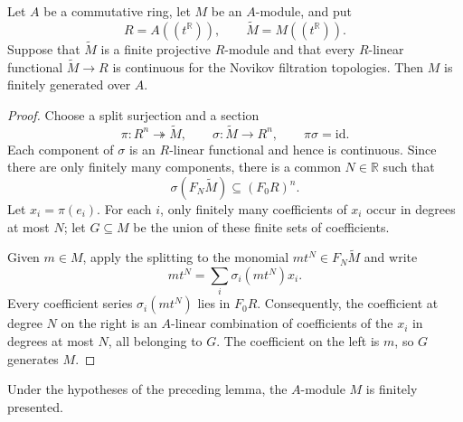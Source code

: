 \begin{lemma}
  \label{lem:finite_generation_real_novikov_series}
  \leanok
  Let $A$ be a commutative ring, let $M$ be an $A$-module, and put
  \[
    R=A((t^{\mathbb{R}})),\qquad \widetilde M=M((t^{\mathbb{R}})).
  \]
  Suppose that $\widetilde M$ is a finite projective $R$-module and that every
  $R$-linear functional $\widetilde M\to R$ is continuous for the Novikov
  filtration topologies.  Then $M$ is finitely generated over $A$.
\end{lemma}

\begin{proof}
  \leanok
  Choose a split surjection and a section
  \[
    \pi\colon R^n\twoheadrightarrow\widetilde M,
    \qquad
    \sigma\colon\widetilde M\longrightarrow R^n,
    \qquad \pi\sigma=\mathrm{id}.
  \]
  Each component of $\sigma$ is an $R$-linear functional and hence is
  continuous.  Since there are only finitely many components, there is a
  common $N\in\mathbb{R}$ such that
  \[
    \sigma(F_N\widetilde M)\subseteq(F_0R)^n.
  \]
  Let $x_i=\pi(e_i)$.  For each $i$, only finitely many coefficients of $x_i$
  occur in degrees at most $N$; let $G\subseteq M$ be the union of these
  finite sets of coefficients.

  Given $m\in M$, apply the splitting to the monomial
  $mt^N\in F_N\widetilde M$ and write
  \[
    mt^N=\sum_i\sigma_i(mt^N)x_i.
  \]
  Every coefficient series $\sigma_i(mt^N)$ lies in $F_0R$.  Consequently,
  the coefficient at degree $N$ on the right is an $A$-linear combination of
  coefficients of the $x_i$ in degrees at most $N$, all belonging to $G$.
  The coefficient on the left is $m$, so $G$ generates $M$.
\end{proof}

\begin{lemma}
  \label{lem:finite_presentation_real_novikov_series}
  \leanok
  Under the hypotheses of the preceding lemma, the $A$-module $M$ is finitely
  presented.
\end{lemma}

